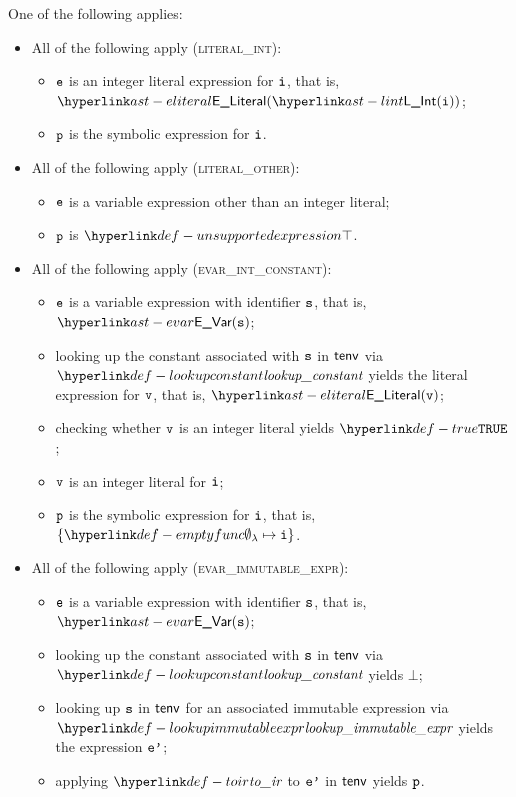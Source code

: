 One of the following applies:
\begin{itemize}
  \item All of the following apply (\textsc{literal\_int}):
  \begin{itemize}
    \item $\texttt{e}$ is an integer literal expression for $\texttt{i}$, that is, $\ELiteral(\lint(\vi))$;
    \item $\texttt{p}$ is the symbolic expression for $\texttt{i}$.
  \end{itemize}

  \item All of the following apply (\textsc{literal\_other}):
  \begin{itemize}
    \item $\texttt{e}$ is a variable expression other than an integer literal;
    \item $\texttt{p}$ is $\CannotBeTransformed$.
  \end{itemize}

  \item All of the following apply (\textsc{evar\_int\_constant}):
  \begin{itemize}
    \item $\texttt{e}$ is a variable expression with identifier $\texttt{s}$, that is, $\EVar(\vs)$;
    \item looking up the constant associated with $\texttt{s}$ in $\textsf{tenv}$ via $\lookupconstant$ yields the literal expression for $\texttt{v}$, that is, $\ELiteral(\vv)$;
    \item checking whether $\texttt{v}$ is an integer literal yields $\True$\ProseOrTypeError;
    \item $\texttt{v}$ is an integer literal for $\texttt{i}$;
    \item $\texttt{p}$ is the symbolic expression for $\texttt{i}$, that is, $\{ \emptyfunc\mapsto \vi \}$.
  \end{itemize}

  \item All of the following apply (\textsc{evar\_immutable\_expr}):
  \begin{itemize}
    \item $\texttt{e}$ is a variable expression with identifier $\texttt{s}$, that is, $\EVar(\vs)$;
    \item looking up the constant associated with $\texttt{s}$ in $\textsf{tenv}$ via $\lookupconstant$ yields $\bot$;
    \item looking up $\texttt{s}$ in $\textsf{tenv}$ for an associated immutable expression via \\
          $\lookupimmutableexpr$ yields the expression $\texttt{e'}$;
    \item applying $\toir$ to $\texttt{e'}$ in $\textsf{tenv}$ yields $\texttt{p}$.
  \end{itemize}


\end{itemize}
